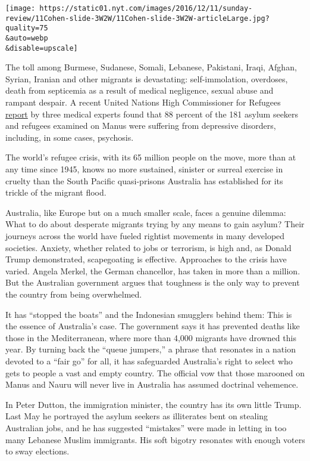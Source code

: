 \texttt{[image: https://static01.nyt.com/images/2016/12/11/sunday-review/11Cohen-slide-3W2W/11Cohen-slide-3W2W-articleLarge.jpg?quality=75\\\&auto=webp\\\&disable=upscale]}

The toll among Burmese, Sudanese, Somali, Lebanese, Pakistani, Iraqi,
Afghan, Syrian, Iranian and other migrants is devastating:
self-immolation, overdoses, death from septicemia as a result of medical
negligence, sexual abuse and rampant despair. A recent United Nations
High Commissioner for Refugees
\href{http://www.unhcr.org/58362da34.pdf}{report} by three medical
experts found that 88 percent of the 181 asylum seekers and refugees
examined on Manus were suffering from depressive disorders, including,
in some cases, psychosis.

The world's refugee crisis, with its 65 million people on the move, more
than at any time since 1945, knows no more sustained, sinister or
surreal exercise in cruelty than the South Pacific quasi-prisons
Australia has established for its trickle of the migrant flood.

Australia, like Europe but on a much smaller scale, faces a genuine
dilemma: What to do about desperate migrants trying by any means to gain
asylum? Their journeys across the world have fueled rightist movements
in many developed societies. Anxiety, whether related to jobs or
terrorism, is high and, as Donald Trump demonstrated, scapegoating is
effective. Approaches to the crisis have varied. Angela Merkel, the
German chancellor, has taken in more than a million. But the Australian
government argues that toughness is the only way to prevent the country
from being overwhelmed.

It has ``stopped the boats'' and the Indonesian smugglers behind them:
This is the essence of Australia's case. The government says it has
prevented deaths like those in the Mediterranean, where more than 4,000
migrants have drowned this year. By turning back the ``queue jumpers,''
a phrase that resonates in a nation devoted to a ``fair go'' for all, it
has safeguarded Australia's right to select who gets to people a vast
and empty country. The official vow that those marooned on Manus and
Nauru will never live in Australia has assumed doctrinal vehemence.

In Peter Dutton, the immigration minister, the country has its own
little Trump. Last May he portrayed the asylum seekers as illiterates
bent on stealing Australian jobs, and he has suggested ``mistakes'' were
made in letting in too many Lebanese Muslim immigrants. His soft bigotry
resonates with enough voters to sway elections.


